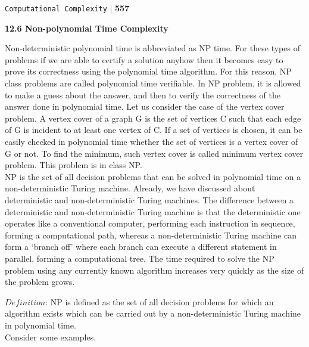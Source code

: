 \documentclass[11pt]{article}
\begin{document}
\begin{flushright}
 \texttt{Computational Complexity} \hspace*{0.10cm}\textbf{$|$} \textbf{557}\hspace*{0.5cm}
\end{flushright}

\vspace*{1cm}
\large{
\textbf{12.6 Non-polynomial Time Complexity}\\
}

\vspace*{0.2cm}
Non-deterministic polynomial time is abbreviated as NP time. For these types of problems if we are able
to certify a solution anyhow then it becomes easy to prove its correctness using the polynomial time
algorithm. For this reason, NP class problems are called polynomial time verifiable. In NP problem, it
is allowed to make a guess about the answer, and then to verify the correctness of the answer done in
polynomial time. Let us consider the case of the vertex cover problem. A vertex cover of a graph G is
the set of vertices C such that each edge of G is incident to at least one vertex of C. If a set of vertices is
chosen, it can be easily checked in polynomial time whether the set of vertices is a vertex cover of G or
not. To find the minimum, such vertex cover is called minimum vertex cover problem. This problem is
in class NP.\\

\hspace*{0.5cm} NP is the set of all decision problems that can be solved in polynomial time on a non-deterministic
Turing machine. Already, we have discussed about deterministic and non-deterministic Turing
machines. The difference between a deterministic and non-deterministic Turing machine is that the
deterministic one operates like a conventional computer, performing each instruction in sequence,
forming a computational path, whereas a non-deterministic Turing machine can form a ‘branch off’
where each branch can execute a different statement in parallel, forming a computational tree. The time
required to solve the NP problem using any currently known algorithm increases very quickly as the
size of the problem grows.\\
\vspace*{0.3cm}

$Definition$: NP is defined as the set of all decision problems for which an algorithm exists which can be
carried out by a non-deterministic Turing machine in polynomial time.\\
\hspace*{0.5cm} Consider some examples.\\
\end{document}
